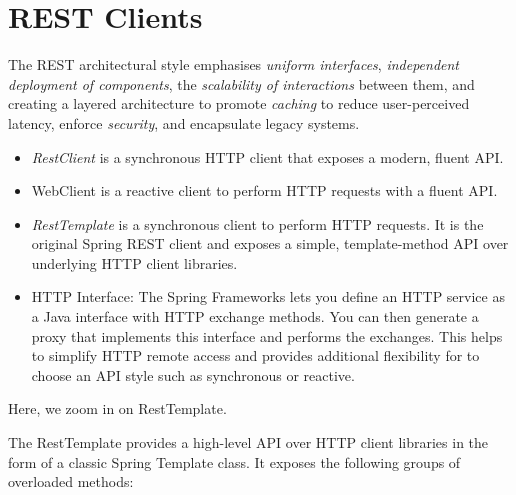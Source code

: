 \documentclass{scrartcl}
\begin{document}
\section{REST Clients}



    The REST architectural style emphasises \textit{uniform interfaces}, \textit{independent deployment of components}, the \textit{scalability of interactions} between them, and creating a layered architecture to promote \textit{caching} to reduce user-perceived latency, enforce \textit{security}, and encapsulate legacy systems.

\begin{itemize}
    \item \textit{RestClient} is a synchronous HTTP client that exposes a modern, fluent API.
    \item WebClient is a reactive client to perform HTTP requests with a fluent API.
    \item \textit{RestTemplate} is a synchronous client to perform HTTP requests. It is the original Spring REST client and exposes a simple, template-method API over underlying HTTP client libraries.
    \item HTTP Interface: The Spring Frameworks lets you define an HTTP service as a Java interface with HTTP exchange methods. You can then generate a proxy that implements this interface and performs the exchanges. This helps to simplify HTTP remote access and provides additional flexibility for to choose an API style such as synchronous or reactive.
\end{itemize}

Here, we zoom in on RestTemplate.

The RestTemplate provides a high-level API over HTTP client libraries in the form of a classic Spring Template class. It exposes the following groups of overloaded methods:
\end{document}
